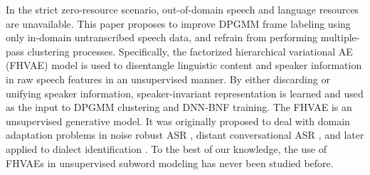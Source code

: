 \documentclass[a4paper]{article}
\begin{document}
In the strict zero-resource scenario, out-of-domain speech and language resources are unavailable. 
This paper proposes to improve DPGMM  frame labeling using only in-domain untranscribed speech data, and refrain from performing multiple-pass clustering processes.
Specifically, the factorized hierarchical variational AE (FHVAE) model \cite{hsu2017nips} is used to disentangle linguistic content and speaker information in raw speech features in an unsupervised manner. By either discarding or unifying speaker information, speaker-invariant representation is learned and  used as the input to DPGMM clustering and DNN-BNF training. 
The FHVAE is an unsupervised generative model.
It was originally proposed to deal with domain adaptation problems in noise robust ASR \cite{hsu2018extracting}, distant conversational ASR \cite{hsu2018unsup},  and later applied to dialect identification \cite{shon2018unsup}. To the best of our knowledge, the use of FHVAEs in unsupervised subword modeling  has never been studied before. 
\end{document}
